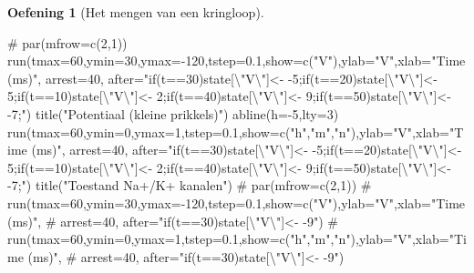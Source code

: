 \documentclass[
  a4paper,
]{scrbook}
\newenvironment{Shaded}{\begin{snugshade}}{\end{snugshade}}
\newcommand{\AttributeTok}[1]{\textcolor[rgb]{0.40,0.45,0.13}{#1}}
\newcommand{\CommentTok}[1]{\textcolor[rgb]{0.37,0.37,0.37}{#1}}
\newcommand{\DecValTok}[1]{\textcolor[rgb]{0.68,0.00,0.00}{#1}}
\newcommand{\FloatTok}[1]{\textcolor[rgb]{0.68,0.00,0.00}{#1}}
\newcommand{\FunctionTok}[1]{\textcolor[rgb]{0.28,0.35,0.67}{#1}}
\newcommand{\NormalTok}[1]{\textcolor[rgb]{0.00,0.23,0.31}{#1}}
\newcommand{\SpecialCharTok}[1]{\textcolor[rgb]{0.37,0.37,0.37}{#1}}
\newcommand{\StringTok}[1]{\textcolor[rgb]{0.13,0.47,0.30}{#1}}
\theoremstyle{definition}
\newtheorem{exercise}{Oefening}[chapter]
\theoremstyle{remark}
\begin{document}
\begin{exercise}[Het mengen van een
kringloop]
\begin{Shaded}
\begin{Highlighting}[]
\CommentTok{\# par(mfrow=c(2,1))}
\FunctionTok{run}\NormalTok{(}\AttributeTok{tmax=}\DecValTok{60}\NormalTok{,}\AttributeTok{ymin=}\DecValTok{30}\NormalTok{,}\AttributeTok{ymax=}\SpecialCharTok{{-}}\DecValTok{120}\NormalTok{,}\AttributeTok{tstep=}\FloatTok{0.1}\NormalTok{,}\AttributeTok{show=}\FunctionTok{c}\NormalTok{(}\StringTok{"V"}\NormalTok{),}\AttributeTok{ylab=}\StringTok{"V"}\NormalTok{,}\AttributeTok{xlab=}\StringTok{"Time (ms)"}\NormalTok{,}
    \AttributeTok{arrest=}\DecValTok{40}\NormalTok{, }\AttributeTok{after=}\StringTok{"if(t==30)state[}\SpecialCharTok{\textbackslash{}"}\StringTok{V}\SpecialCharTok{\textbackslash{}"}\StringTok{]\textless{}{-} {-}5;if(t==20)state[}\SpecialCharTok{\textbackslash{}"}\StringTok{V}\SpecialCharTok{\textbackslash{}"}\StringTok{]\textless{}{-} 5;if(t==10)state[}\SpecialCharTok{\textbackslash{}"}\StringTok{V}\SpecialCharTok{\textbackslash{}"}\StringTok{]\textless{}{-} 2;if(t==40)state[}\SpecialCharTok{\textbackslash{}"}\StringTok{V}\SpecialCharTok{\textbackslash{}"}\StringTok{]\textless{}{-} 9;if(t==50)state[}\SpecialCharTok{\textbackslash{}"}\StringTok{V}\SpecialCharTok{\textbackslash{}"}\StringTok{]\textless{}{-} {-}7;"}\NormalTok{)}
\FunctionTok{title}\NormalTok{(}\StringTok{"Potentiaal (kleine prikkels)"}\NormalTok{)}
\FunctionTok{abline}\NormalTok{(}\AttributeTok{h=}\SpecialCharTok{{-}}\DecValTok{5}\NormalTok{,}\AttributeTok{lty=}\DecValTok{3}\NormalTok{)}
\FunctionTok{run}\NormalTok{(}\AttributeTok{tmax=}\DecValTok{60}\NormalTok{,}\AttributeTok{ymin=}\DecValTok{0}\NormalTok{,}\AttributeTok{ymax=}\DecValTok{1}\NormalTok{,}\AttributeTok{tstep=}\FloatTok{0.1}\NormalTok{,}\AttributeTok{show=}\FunctionTok{c}\NormalTok{(}\StringTok{"h"}\NormalTok{,}\StringTok{"m"}\NormalTok{,}\StringTok{"n"}\NormalTok{),}\AttributeTok{ylab=}\StringTok{"V"}\NormalTok{,}\AttributeTok{xlab=}\StringTok{"Time (ms)"}\NormalTok{,}
    \AttributeTok{arrest=}\DecValTok{40}\NormalTok{, }\AttributeTok{after=}\StringTok{"if(t==30)state[}\SpecialCharTok{\textbackslash{}"}\StringTok{V}\SpecialCharTok{\textbackslash{}"}\StringTok{]\textless{}{-} {-}5;if(t==20)state[}\SpecialCharTok{\textbackslash{}"}\StringTok{V}\SpecialCharTok{\textbackslash{}"}\StringTok{]\textless{}{-} 5;if(t==10)state[}\SpecialCharTok{\textbackslash{}"}\StringTok{V}\SpecialCharTok{\textbackslash{}"}\StringTok{]\textless{}{-} 2;if(t==40)state[}\SpecialCharTok{\textbackslash{}"}\StringTok{V}\SpecialCharTok{\textbackslash{}"}\StringTok{]\textless{}{-} 9;if(t==50)state[}\SpecialCharTok{\textbackslash{}"}\StringTok{V}\SpecialCharTok{\textbackslash{}"}\StringTok{]\textless{}{-} {-}7;"}\NormalTok{)}
\FunctionTok{title}\NormalTok{(}\StringTok{"Toestand Na+/K+ kanalen"}\NormalTok{)}
\CommentTok{\# par(mfrow=c(2,1))}
\CommentTok{\# run(tmax=60,ymin=30,ymax={-}120,tstep=0.1,show=c("V"),ylab="V",xlab="Time (ms)",}
\CommentTok{\#     arrest=40, after="if(t==30)state[\textbackslash{}"V\textbackslash{}"]\textless{}{-} {-}9")}
\CommentTok{\# run(tmax=60,ymin=0,ymax=1,tstep=0.1,show=c("h","m","n"),ylab="V",xlab="Time (ms)",}
\CommentTok{\#     arrest=40, after="if(t==30)state[\textbackslash{}"V\textbackslash{}"]\textless{}{-} {-}9")}


\end{Highlighting}
\end{Shaded}
\end{exercise}
\end{document}
